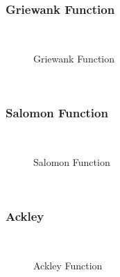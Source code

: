 \subsubsection{Griewank Function}
~
\begin{figure}[ht]
	\centering
	\setlength \fboxsep{0pt}
	\setlength \fboxrule{0.5pt}
	\caption{Griewank Function}
	\label{fig:GriewankGraph}
\end{figure}
~
\subsubsection{Salomon Function}
~
\begin{figure}[ht]
	\centering
	\setlength \fboxsep{0pt}
	\setlength \fboxrule{0.5pt}
	\caption{Salomon Function}
	\label{fig:SalomonGraph}
\end{figure}
~
\subsubsection{Ackley}
~
\begin{figure}[ht]
	\centering
	\setlength \fboxsep{0pt}
	\setlength \fboxrule{0.5pt}
	\caption{Ackley Function}
	\label{fig:AckleyGraph}
\end{figure}
~
